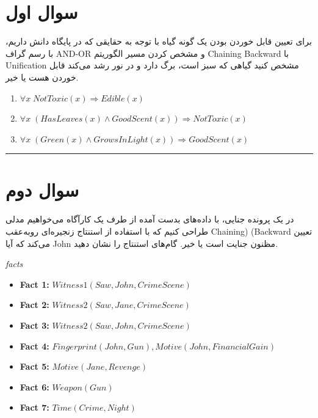 \documentclass[a4paper,10pt]{article}
\begin{document}


\section{سوال اول}

برای تعیین قابل خوردن بودن یک گونه گیاه با توجه به حقایقی که در پایگاه دانش داریم، با رسم گراف AND-OR و مشخص کردن مسیر الگوریتم 
Chaining Backward  
با Unification مشخص کنید گیاهی که سبز است، برگ دارد و در نور رشد می‌کند قابل خوردن هست یا خیر.

\begin{latin}
\begin{enumerate}
	\item $\forall x \; NotToxic(x) \Rightarrow Edible(x)$
	\item $\forall x \; (HasLeaves(x) \land GoodScent(x)) \Rightarrow NotToxic(x)$
	\item $\forall x \; (Green(x) \land GrowsInLight(x)) \Rightarrow GoodScent(x)$
\end{enumerate}
\end{latin}


\bigskip
\rule{\linewidth}{0.4pt}

\section{سوال دوم}


در یک پرونده جنایی، با داده‌های بدست آمده از طرف یک کارآگاه می‌خواهیم مدلی طراحی کنیم که با استفاده از استنتاج زنجیره‌ای روبه‌عقب 
Chaining) (Backward 
 تعیین می‌کند که آیا John مظنون جنایت است یا خیر. گام‌های استنتاج را نشان دهید.


\begin{latin}
	\emph{facts}
\begin{itemize}
	\item \textbf{Fact 1:} $Witness1(Saw, John, CrimeScene)$
	\item \textbf{Fact 2:} $Witness2(Saw, Jane, CrimeScene)$
	\item \textbf{Fact 3:} $Witness2(Saw, John, CrimeScene)$
	\item \textbf{Fact 4:} $Fingerprint(John, Gun), Motive(John, FinancialGain)$
	\item \textbf{Fact 5:} $Motive(Jane, Revenge)$
	\item \textbf{Fact 6:} $Weapon(Gun)$
	\item \textbf{Fact 7:} $Time(Crime, Night)$
\end{itemize}
\end{latin}
\end{document}

